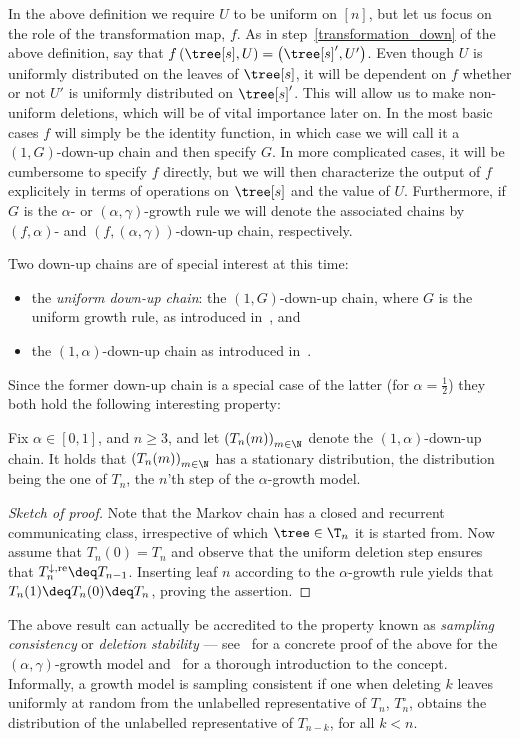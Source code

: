 %
In the above definition we require $U$ to be uniform on $[n]$, but let us focus on the role of the transformation map, $f$.
As in step~\ref{transformation_down} of the above definition, say that $f \left( \tree[s], U \right) = \left( \tree[s]', U' \right)$.
Even though $U$ is uniformly distributed on the leaves of $\tree[s]$, it will be dependent on $f$ whether or not $U'$ is uniformly distributed on $\tree[s]'$.
This will allow us to make non-uniform deletions, which will be of vital importance later on.
In the most basic cases $f$ will simply be the identity function, in which case we will call it a $(1,G)$-down-up chain and then specify $G$.
In more complicated cases, it will be cumbersome to specify $f$ directly, but we will then characterize the output of $f$ explicitely in terms of operations on $\tree[s]$ and the value of $U$.
Furthermore, if $G$ is the $\alpha$- or $(\alpha, \gamma)$-growth rule we will denote the associated chains by $(f, \alpha)$- and $\left(f, (\alpha, \gamma)\right)$-down-up chain, respectively.

\noindent
Two down-up chains are of special interest at this time:
%
\begin{itemize}
  \item the \textit{uniform down-up chain}: the $(1, G)$-down-up chain, where $G$ is the uniform growth rule, as introduced in~\cite{RefWorks:doc:5b4cbc14e4b04428cc72cf41}, and
  \item the $(1, \alpha)$-down-up chain as introduced in~\cite{RefWorks:doc:5b4cbc93e4b07f5746e47014}.
\end{itemize}
%
Since the former down-up chain is a special case of the latter (for $\alpha = \frac{1}{2}$) they both hold the following interesting property:
%
\begin{thm}
  Fix $\alpha \in [0,1]$, and $n \geq 3$, and let ${\left( T_n(m) \right)}_{m \in \N}$ denote the $(1, \alpha)$-down-up chain.
  It holds that ${\left( T_n(m) \right)}_{m \in \N}$ has a stationary distribution, the distribution being the one of $T_n$, the $n$'th step of the $\alpha$-growth model.
\end{thm}
%
\begin{proof}[Sketch of proof]
    Note that the Markov chain has a closed and recurrent communicating class, irrespective of which $\tree \in \T_n$ it is started from.
    Now assume that $T_n(0) = T_n$ and observe that the uniform deletion step ensures that $T_n^{\downarrow, \text{re}} \deq T_{n-1}$.
    Inserting leaf $n$ according to the $\alpha$-growth rule yields that $T_n(1) \deq T_n(0) \deq T_n$, proving the assertion.
\end{proof}
%
The above result can actually be accredited to the property known as \textit{sampling consistency} or \textit{deletion stability} --- see~\cite{RefWorks:doc:5b4cbb5fe4b02dc0c79270af} for a concrete proof of the above for the $(\alpha, \gamma)$-growth model and~\cite{RefWorks:doc:5b76ce32e4b0820c421f301d} for a thorough introduction to the concept.
Informally, a growth model is sampling consistent if one when deleting $k$ leaves uniformly at random from the unlabelled representative of $T_n$, $T_n^\circ$, obtains the distribution of the unlabelled representative of $T_{n-k}$, for all $k < n$.

